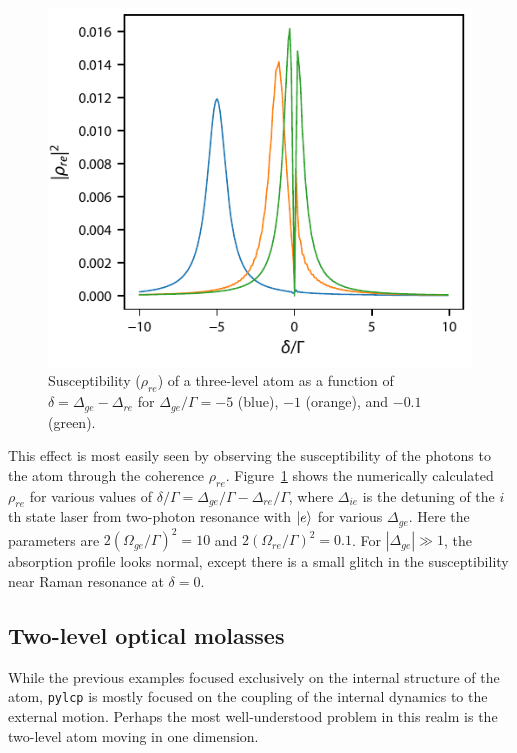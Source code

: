 \documentclass[final,5p,times,twocolumn]{elsarticle}
\begin{document}
\begin{figure}
	\center
	\includegraphics{figs/eit_susceptibility.pdf}
	\caption{\label{fig:eit_susceptibility} Susceptibility ($\rho_{re}$) of a three-level atom as a function of $\delta = \Delta_{ge}-\Delta_{re}$ for $\Delta_{ge}/\Gamma=-5$ (blue), $-1$ (orange), and $-0.1$ (green).}
\end{figure}

This effect is most easily seen by observing the susceptibility of the photons to the atom through the coherence $\rho_{re}$.  Figure~\ref{fig:eit_susceptibility} shows the numerically calculated $\rho_{re}$ for various values of $\delta/\Gamma = \Delta_{ge}/\Gamma-\Delta_{re}/\Gamma$, where $\Delta_{ie}$ is the detuning of the $i$th state laser from two-photon resonance with $\ket{e}$ for various $\Delta_{ge}$.  Here the parameters are $2(\Omega_{ge}/\Gamma)^2=10$ and $2(\Omega_{re}/\Gamma)^2=0.1$.  For $|\Delta_{ge}|\gg 1$, the absorption profile looks normal, except there is a small glitch in the susceptibility near Raman resonance at $\delta=0$.

\subsection{Two-level optical molasses}
While the previous examples focused exclusively on the internal structure of the atom, {\tt pylcp} is mostly focused on the coupling of the internal dynamics to the external motion.  Perhaps the most well-understood problem in this realm is the two-level atom moving in one dimension.
\end{document}
